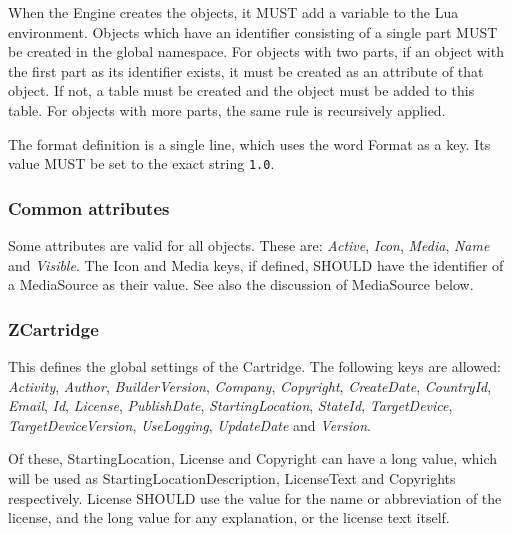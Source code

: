 \documentclass{article}
\begin{document}
When the Engine creates the objects, it MUST add a variable to the Lua
environment.  Objects which have an identifier consisting of a single part MUST
be created in the global namespace.  For objects with two parts, if an object
with the first part as its identifier exists, it must be created as an
attribute of that object.  If not, a table must be created and the object must
be added to this table.  For objects with more parts, the same rule is
recursively applied.

The format definition is a single line, which uses the word Format as a key.
Its value MUST be set to the exact string \texttt{1.0}.

\newcommand\defkey[5]{\par\noindent\begin{tabular}{|l|l|}\hline Key&#1\\Value&\parbox{.75\textwidth}{#2}\\Long Value&\parbox{.75\textwidth}{#3}\\Comments&\parbox{.75\textwidth}{#4}\\\hline\end{tabular}\par}

\subsubsection{Common attributes}
Some attributes are valid for all objects.  These are: \textit{Active},
\textit{Icon}, \textit{Media}, \textit{Name} and \textit{Visible}.  The Icon
and Media keys, if defined, SHOULD have the identifier of a MediaSource as
their value.  See also the discussion of MediaSource below.

\subsubsection{ZCartridge}
This defines the global settings of the Cartridge.  The following keys are allowed: \textit{Activity}, \textit{Author}, \textit{BuilderVersion}, \textit{Company}, \textit{Copyright}, \textit{CreateDate}, \textit{CountryId}, \textit{Email}, \textit{Id}, \textit{License}, \textit{PublishDate}, \textit{StartingLocation}, \textit{StateId}, \textit{TargetDevice}, \textit{TargetDeviceVersion}, \textit{UseLogging}, \textit{UpdateDate} and \textit{Version}.

Of these, StartingLocation, License and Copyright can have a long value, which will be used as StartingLocationDescription, LicenseText and Copyrights respectively.  License SHOULD use the value for the name or abbreviation of the license, and the long value for any explanation, or the license text itself.
\end{document}
